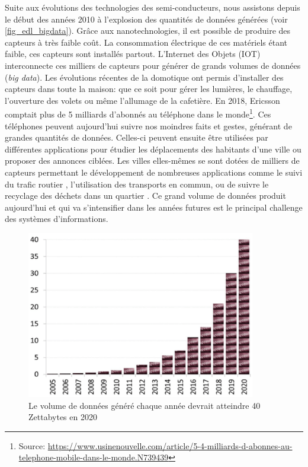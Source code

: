             Suite aux évolutions des technologies des semi-conducteurs, nous assistons depuis le début des années 2010 à l'explosion des quantités de données générées (voir \autoref{fig_edl_bigdata}). Grâce aux nanotechnologies, il est possible de produire des capteurs à très faible coût. La consommation électrique de ces matériels étant faible, ces capteurs sont installés partout. L’Internet des Objets (IOT) interconnecte ces milliers de capteurs pour générer de grands volumes de données (\textit{big data}).  Les évolutions récentes de la domotique ont permis d'installer des capteurs dans toute la maison: que ce soit pour gérer les lumières, le chauffage, l'ouverture des volets ou même l'allumage de la cafetière. En 2018, Ericsson comptait plus de 5 milliards d'abonnés au téléphone dans le monde\footnote{Source: \url{https://www.usinenouvelle.com/article/5-4-milliards-d-abonnes-au-telephone-mobile-dans-le-monde.N739439}}. Ces téléphones peuvent aujourd'hui suivre nos moindres faits et gestes, générant de grandes quantités de données. Celles-ci peuvent ensuite être utilisées par différentes applications pour étudier les déplacements des habitants d'une ville ou proposer des annonces ciblées. Les villes elles-mêmes se sont dotées de milliers de capteurs permettant le développement de nombreuses applications comme le suivi du trafic routier \cite{bonhomme:hal-01334670}, l'utilisation des transports en commun, ou de suivre le recyclage des déchets dans un quartier \cite{Rebelles2018}. Ce grand volume de données produit aujourd'hui et qui va s'intensifier dans les années futures est le principal challenge des systèmes d'informations.
        
              
            \begin{figure}
            \center
            \includegraphics[width=10cm]{images/edl_bigdata.png}
            \caption{\label{fig_edl_bigdata} Le volume de données généré chaque année devrait atteindre 40 Zettabytes en 2020 \cite{Simoudis2016}}
            \end{figure}
        
